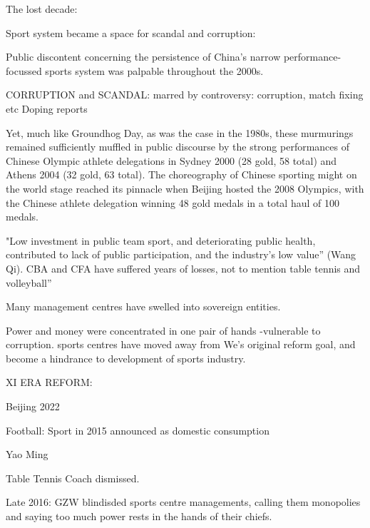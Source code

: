 The lost decade:

Sport system became a space for scandal and corruption:

Public discontent concerning the persistence of China's narrow performance-focussed sports system was palpable throughout the 2000s.

CORRUPTION and SCANDAL:
marred by controversy:
corruption, match fixing etc
Doping reports


Yet, much like Groundhog Day, as was the case in the 1980s, these murmurings remained sufficiently muffled in public discourse by the strong performances of Chinese Olympic athlete delegations in Sydney 2000 (28 gold, 58 total) and Athens 2004 (32 gold, 63 total). The choreography of Chinese sporting might on the world stage reached its pinnacle when Beijing hosted the 2008 Olympics, with the Chinese athlete delegation winning 48 gold medals in a total haul of 100 medals.


"Low investment in public team sport, and deteriorating public health, contributed to lack of public participation, and the industry’s low value” (Wang Qi). CBA and CFA have suffered years of losses, not to mention table tennis and volleyball”

Many management centres have swelled into sovereign entities.

Power and money were concentrated in one pair of hands -vulnerable to corruption.  sports centres have moved away from We’s original reform goal, and become a hindrance to development of sports industry.


XI ERA REFORM:

Beijing 2022

Football:
Sport in 2015 announced as domestic consumption

Yao Ming

Table Tennis Coach dismissed.

Late 2016:  GZW blindisded sports centre managements, calling them monopolies and saying too much power rests in the hands of their chiefs.







